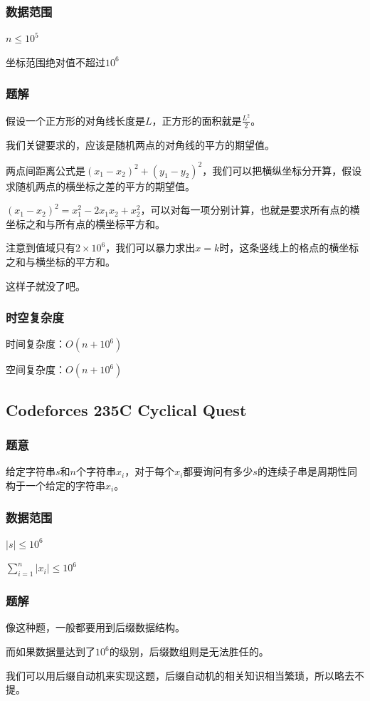 \documentclass{ctexart}
\begin{document}
\subsubsection{数据范围}
$n \le 10^5$

坐标范围绝对值不超过$10^6$
\subsubsection{题解}
假设一个正方形的对角线长度是$L$，正方形的面积就是$\frac{L^2}{2}$。

我们关键要求的，应该是随机两点的对角线的平方的期望值。

两点间距离公式是$(x_1-x_2)^2+(y_1-y_2)^2$，我们可以把横纵坐标分开算，假设求随机两点的横坐标之差的平方的期望值。

$(x_1-x_2)^2=x_1^2-2x_1x_2+x_2^2$，可以对每一项分别计算，也就是要求所有点的横坐标之和与所有点的横坐标平方和。

注意到值域只有$2 \times 10^6$，我们可以暴力求出$x=k$时，这条竖线上的格点的横坐标之和与横坐标的平方和。

这样子就没了吧。
\subsubsection{时空复杂度}
时间复杂度：$O(n+10^6)$

空间复杂度：$O(n+10^6)$
\subsection{Codeforces 235C Cyclical Quest}
\subsubsection{题意}
给定字符串$s$和$n$个字符串$x_i$，对于每个$x_i$都要询问有多少$s$的连续子串是周期性同构于一个给定的字符串$x_i$。
\subsubsection{数据范围}
$|s| \le 10^6$

$\sum\limits_{i=1}^n |x_i| \le 10^6$
\subsubsection{题解}
像这种题，一般都要用到后缀数据结构。

而如果数据量达到了$10^6$的级别，后缀数组则是无法胜任的。

我们可以用后缀自动机来实现这题，后缀自动机的相关知识相当繁琐，所以略去不提。
\end{document}
